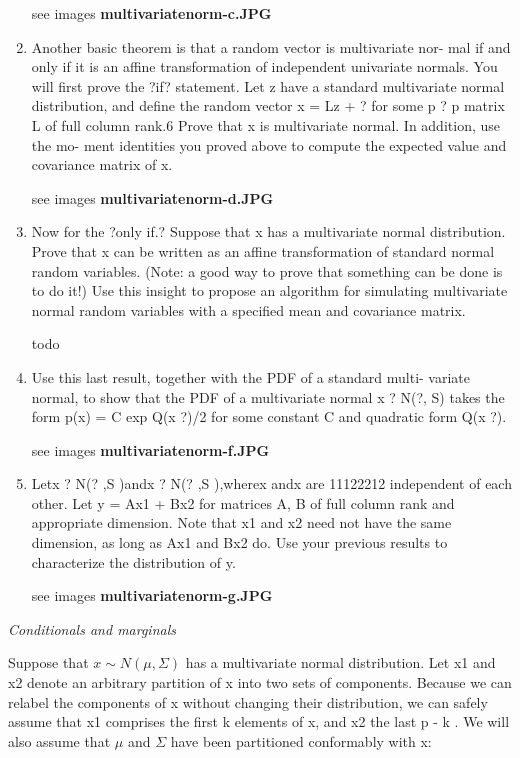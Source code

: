 \documentclass{homework}
\begin{document}
\begin{enumerate}[label=(\Alph*)]
\par * see images \textbf{multivariatenorm-c.JPG}

\item Another basic theorem is that a random vector is multivariate nor- mal if and only if it is an affine transformation of independent univariate normals. You will first prove the ?if? statement. Let z have a standard multivariate normal distribution, and define the random vector x = Lz + ? for some p ? p matrix L of full column rank.6 Prove that x is multivariate normal. In addition, use the mo- ment identities you proved above to compute the expected value and covariance matrix of x.

\par * see images \textbf{multivariatenorm-d.JPG}

\item Now for the ?only if.? Suppose that x has a multivariate normal distribution. Prove that x can be written as an affine transformation of standard normal random variables. (Note: a good way to prove that something can be done is to do it!) Use this insight to propose an algorithm for simulating multivariate normal random variables with a specified mean and covariance matrix.

\par todo

\item Use this last result, together with the PDF of a standard multi- variate normal, to show that the PDF of a multivariate normal
x ? N(?, S) takes the form p(x) = C exp{ Q(x   ?)/2} for some constant C and quadratic form Q(x   ?).

\par * see images \textbf{multivariatenorm-f.JPG}

\item Letx ? N(? ,S )andx ? N(? ,S ),wherex andx are 11122212
independent of each other. Let y = Ax1 + Bx2 for matrices A, B of full column rank and appropriate dimension. Note that x1 and x2 need not have the same dimension, as long as Ax1 and Bx2 do. Use your previous results to characterize the distribution of y.

\par * see images \textbf{multivariatenorm-g.JPG}

\end{enumerate}

\par \noindent \textit{Conditionals and marginals}

\par Suppose that $x \sim N(\mu, \Sigma)$ has a multivariate normal distribution. Let x1 and x2 denote an arbitrary partition of x into two sets of components. Because we can relabel the components of x without changing their distribution, we can safely assume that x1 comprises the first k elements of x, and x2 the last p - k . We will also assume that $\mu$ and $\Sigma$ have been partitioned conformably with x:
\end{document}
